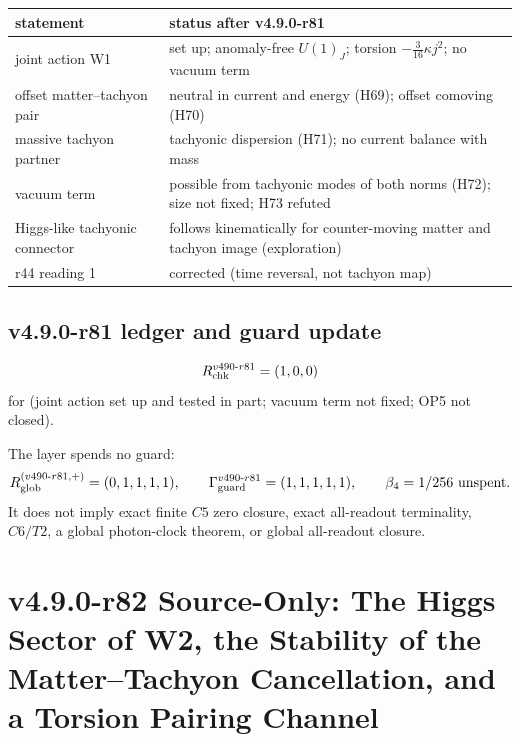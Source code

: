 \begin{center}
\small
\begin{tabular}{@{}>{\raggedright\arraybackslash}p{}>{\raggedright\arraybackslash}p{}@{}}
\toprule
statement & status after v4.9.0-r81\\
\midrule
joint action W1 & set up; anomaly-free \(U(1)_J\); torsion \(-\tfrac3{16}\kappa j^2\); no vacuum term\\
offset matter--tachyon pair & neutral in current and energy (H69); offset comoving (H70)\\
massive tachyon partner & tachyonic dispersion (H71); no current balance with mass\\
vacuum term & possible from tachyonic modes of both norms (H72); size not fixed; H73 refuted\\
Higgs-like tachyonic connector & follows kinematically for counter-moving matter and tachyon image (exploration)\\
r44 reading 1 & corrected (time reversal, not tachyon map)\\
\bottomrule
\end{tabular}
\end{center}

\subsection*{v4.9.0-r81 ledger and guard update}
\label{subsec:v490-r81-ledger-guard}

\[
R_{\rm chk}^{v490\text{-}r81}=(1,0,0)
\]
for (joint action set up and tested in part; vacuum term not fixed; OP5 not closed).

The layer spends no guard:
\[
R_{\rm glob}^{(v490\text{-}r81,+)}=(0,1,1,1,1),
\qquad
\Gamma_{\rm guard}^{v490\text{-}r81}=(1,1,1,1,1),
\qquad
\beta_4=1/256\ \text{unspent}.
\]
It does not imply exact finite \(C5\) zero closure, exact all-readout terminality,
\(C6/T2\), a global photon-clock theorem, or global all-readout closure.


\clearpage
\section*{v4.9.0-r82 Source-Only: The Higgs Sector of W2, the Stability of the Matter--Tachyon Cancellation, and a Torsion Pairing Channel}
\label{sec:v490-r82-higgs-stability}

